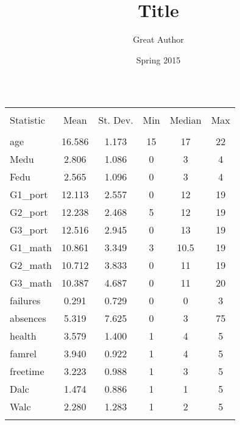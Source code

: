 \documentclass[11pt]{article}
\title{Title}
\author{Great Author}
\date{Spring 2015}
\begin{document}
\begin{table}[!htbp] \centering 
  \caption{} 
  \label{} 
\begin{tabular}{@{\extracolsep{5pt}}lccccc} 
\\[-1.8ex]\hline 
\hline \\[-1.8ex] 
Statistic & \multicolumn{1}{c}{Mean} & \multicolumn{1}{c}{St. Dev.} & \multicolumn{1}{c}{Min} & \multicolumn{1}{c}{Median} & \multicolumn{1}{c}{Max} \\ 
\hline \\[-1.8ex] 
age & 16.586 & 1.173 & 15 & 17 & 22 \\ 
Medu & 2.806 & 1.086 & 0 & 3 & 4 \\ 
Fedu & 2.565 & 1.096 & 0 & 3 & 4 \\ 
G1\_port & 12.113 & 2.557 & 0 & 12 & 19 \\ 
G2\_port & 12.238 & 2.468 & 5 & 12 & 19 \\ 
G3\_port & 12.516 & 2.945 & 0 & 13 & 19 \\ 
G1\_math & 10.861 & 3.349 & 3 & 10.5 & 19 \\ 
G2\_math & 10.712 & 3.833 & 0 & 11 & 19 \\ 
G3\_math & 10.387 & 4.687 & 0 & 11 & 20 \\ 
failures & 0.291 & 0.729 & 0 & 0 & 3 \\ 
absences & 5.319 & 7.625 & 0 & 3 & 75 \\ 
health & 3.579 & 1.400 & 1 & 4 & 5 \\ 
famrel & 3.940 & 0.922 & 1 & 4 & 5 \\ 
freetime & 3.223 & 0.988 & 1 & 3 & 5 \\ 
Dalc & 1.474 & 0.886 & 1 & 1 & 5 \\ 
Walc & 2.280 & 1.283 & 1 & 2 & 5 \\ 
\hline \\[-1.8ex] 
\end{tabular} 
\end{table} 
\end{document}
